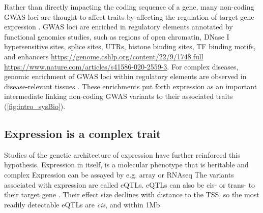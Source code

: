 \begin{outline}
\1 Rather than directly impacting the coding sequence of a gene, 
many non-coding GWAS loci are thought to affect traits by affecting the regulation of target gene expression \autocite{gallagher2018PostGWASEraAssociation}.
\gls{GWAS} loci are enriched in regulatory elements annotated by functional genomics studies, such as
    regions of open chromatin, 
    DNase I hypersensitive sites,
    splice sites, UTRs,
    histone binding sites, 
    \gls{TF} binding motifs,
    and enhancers \autocite{trynka2015DisentanglingEffectsColocalizing,gallagher2018PostGWASEraAssociation} \url{https://genome.cshlp.org/content/22/9/1748.full} \url{https://www.nature.com/articles/s41586-020-2559-3}.
\2 For complex diseases, genomic enrichment of GWAS loci within regulatory elements are observed in disease-relevant tissues \autocite{visscher201710YearsGWAS}.
\2 These enrichments put forth expression as an important intermediate linking non-coding \gls{GWAS} variants to their associated traits (\autoref{fig:intro_sysBio}).

\subsection{Expression is a complex trait}

\1 Studies of the genetic architecture of expression have further reinforced this hypothesis.
    \2 Expression in itself, is a molecular phenotype that is heritable and complex \autocite{gaffney2013GlobalPropertiesFunctional}
    \2 Expression can be assayed by e.g. array or RNAseq
    \2 The variants associated with expression are called \glspl{eQTL}.
    \2 eQTLs can also be cis- or trans- to their target gene \autocite{albert2015RoleRegulatoryVariation}.
    \2 Their effect size declines with distance to the TSS, so the most readily detectable eQTLs are \textit{cis}, and within 1Mb \autocite{vandiedonck2017GeneticAssociationMolecular}


\end{outline}
